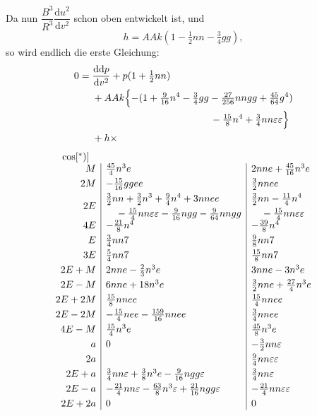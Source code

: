 \clearpage
\begingroup
{}
\renewcommand{\headrulewidth}{0pt}
\par\noindent\hspace*{\parindent}Da nun \(\dfrac{B^3}{R^3}\dfrac{\mathrm du^2}{\mathrm dv^2}\) schon oben entwickelt ist, und
\[
h=AAk(1-\tfrac12nn-\tfrac34gg),
\]
\noindent so wird endlich die erste Gleichung:
\[
\begin{aligned}
0={}&\frac{\mathrm d\mathrm dp}{\mathrm dv^2}+p(1+\tfrac12nn)\\
&+AAk\Bigl\{-(1+\tfrac{9}{16}n^4-\tfrac34gg-\tfrac{27}{256}nngg+\tfrac{45}{64}g^4)\\
&\hspace{42mm}-\tfrac{15}{8}n^4+\tfrac34nn\varepsilon\varepsilon\Bigr\}\\
&+h\times
\end{aligned}
\]
\[
\begin{array}{r|l|l}
\multicolumn{1}{c}{\cos[{}^{*})]}&\multicolumn{1}{c}{}&\\
M&\tfrac{45}{4}n^3e&2nne+\tfrac{45}{16}n^3e\\[3pt]
2M&-\tfrac{15}{16}ggee&\tfrac32nnee\\[3pt]
2E&\begin{aligned}
&\tfrac32nn+\tfrac32n^3+\tfrac94n^4+3nnee\\
&\quad-\tfrac{15}{4}nn\varepsilon\varepsilon-\tfrac{9}{16}ngg-\tfrac{9}{64}nngg
\end{aligned}&
\begin{aligned}
&\tfrac32nn-\tfrac{11}{4}n^4\\
&\quad-\tfrac{15}{4}nn\varepsilon\varepsilon
\end{aligned}\\[3pt]
4E&-\tfrac{21}{8}n^4&-\tfrac{39}{8}n^4\\[3pt]
E&\tfrac34nn7&\tfrac98nn7\\[3pt]
3E&\tfrac54nn7&\tfrac{15}{8}nn7\\[3pt]
2E+M&2nne-\tfrac23n^3e&3nne-3n^3e\\[3pt]
2E-M&6nne+18n^3e&\tfrac32nne+\tfrac{27}{4}n^3e\\[3pt]
2E+2M&\tfrac{15}{8}nnee&\tfrac{15}{4}nnee\\[3pt]
2E-2M&-\tfrac{15}{4}nee-\tfrac{159}{16}nnee&\tfrac34nnee\\[3pt]
4E-M&\tfrac{15}{4}n^3e&\tfrac{45}{8}n^3e\\[3pt]
a&0&-\tfrac32nn\varepsilon\\[3pt]
2a&&\tfrac94nn\varepsilon\varepsilon\\[3pt]
2E+a&\tfrac34nn\varepsilon+\tfrac38n^3e-\tfrac{9}{16}ngg\varepsilon&\tfrac34nn\varepsilon\\[3pt]
2E-a&-\tfrac{21}{4}nn\varepsilon-\tfrac{63}{8}n^3\varepsilon+\tfrac{21}{16}ngg\varepsilon&-\tfrac{21}{4}nn\varepsilon\varepsilon\\[3pt]
2E+2a&0&0
\end{array}
\]
